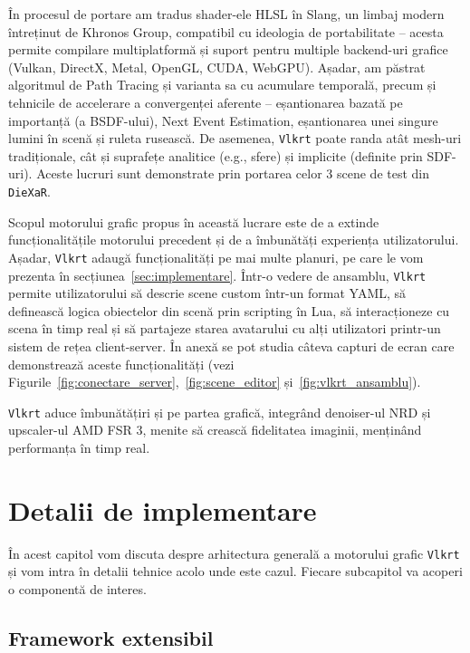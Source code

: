 \documentclass[12pt,a4paper]{report}
\numberwithin{equation}{section} %
\begin{document}
În procesul de portare am tradus shader-ele HLSL în Slang, un limbaj modern întreținut de Khronos Group, compatibil cu ideologia de portabilitate -- acesta permite compilare multiplatformă și suport pentru multiple backend-uri grafice (Vulkan, DirectX, Metal, OpenGL, CUDA, WebGPU).
Așadar, am păstrat algoritmul de Path Tracing și varianta sa cu acumulare temporală, precum și tehnicile de accelerare a convergenței aferente -- eșantionarea bazată pe importanță (a BSDF-ului), Next Event Estimation, eșantionarea unei singure lumini în scenă și ruleta rusească.
De asemenea, \texttt{Vlkrt} poate randa atât mesh-uri tradiționale, cât și suprafețe analitice (e.g., sfere) și implicite (definite prin SDF-uri).
Aceste lucruri sunt demonstrate prin portarea celor 3 scene de test din \texttt{DieXaR}.

Scopul motorului grafic propus în această lucrare este de a extinde funcționalitățile motorului precedent și de a îmbunătăți experiența utilizatorului.
Așadar, \texttt{Vlkrt} adaugă funcționalități pe mai multe planuri, pe care le vom prezenta în secțiunea~\ref{sec:implementare}.
Într-o vedere de ansamblu, \texttt{Vlkrt} permite utilizatorului să descrie scene custom într-un format YAML, să definească logica obiectelor din scenă prin scripting în Lua, să interacționeze cu scena în timp real și să partajeze starea avatarului cu alți utilizatori printr-un sistem de rețea client-server.
În anexă se pot studia câteva capturi de ecran care demonstrează aceste funcționalități (vezi Figurile~\ref{fig:conectare_server},~\ref{fig:scene_editor} și~\ref{fig:vlkrt_ansamblu}).

\texttt{Vlkrt} aduce îmbunătățiri și pe partea grafică, integrând denoiser-ul NRD și upscaler-ul AMD FSR 3, menite să crească fidelitatea imaginii, menținând performanța în timp real.

\chapter{\label{sec:implementare}Detalii de implementare}

În acest capitol vom discuta despre arhitectura generală a motorului grafic \texttt{Vlkrt} și vom intra în detalii tehnice acolo unde este cazul.
Fiecare subcapitol va acoperi o componentă de interes.

\section{Framework extensibil}
\end{document}
